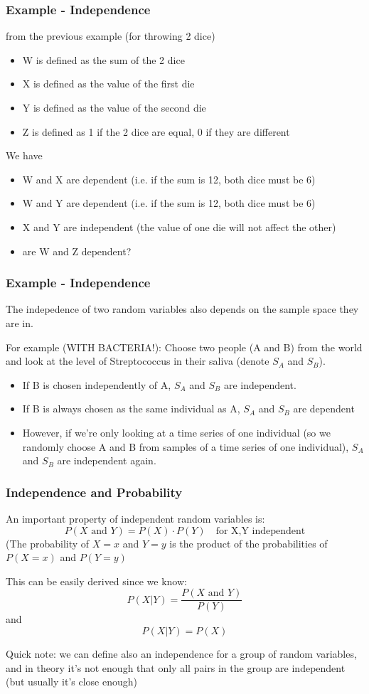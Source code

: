 \documentclass{beamer}
\begin{document}
\begin{frame}
\frametitle{Example - Independence}
from the previous example (for throwing 2 dice)
\begin{itemize}
\item W is defined as the sum of the 2 dice
\item X is defined as the value of the first die
\item Y is defined as the value of the second die
\item Z is defined as 1 if the 2 dice are equal, 0 if they are different
\end{itemize}

We have
\begin{itemize}
\item W and X are dependent (i.e. if the sum is 12, both dice must be 6)
\item W and Y are dependent (i.e. if the sum is 12, both dice must be 6)
\item X and Y are independent (the value of one die will not affect the other)
\item are W and Z dependent?
\end{itemize}

\end{frame}
\begin{frame}
\frametitle{Example - Independence}
The indepedence of two random variables also depends on the sample space they are in.

For example (WITH BACTERIA!):
Choose two people (A and B) from the world and look at the level of Streptococcus in their saliva (denote $S_A$ and $S_B$).
\begin{itemize}
\item If B is chosen independently of A, $S_A$ and $S_B$ are independent.
\item If B is always chosen as the same individual as A, $S_A$ and $S_B$ are dependent
\item However, if we're only looking at a time series of one individual (so we randomly choose A and B from samples of a time series of one individual), $S_A$ and $S_B$ are independent again.
\end{itemize}
\end{frame}

\begin{frame}
\frametitle{Independence and Probability}
An important property of independent random variables is:
$$ P(X \text{ and } Y) = P(X) \cdot P(Y) \quad \text{for X,Y independent}$$
(The probability of $X=x$ and $Y=y$ is the product of the probabilities of $P(X=x)$ and $P(Y=y)$

This can be easily derived since we know:
$$ P(X|Y)=\frac{P(X \text{ and } Y)}{P(Y)}$$ and $$P(X|Y)=P(X)$$

Quick note: we can define also an independence for a group of random variables, and in theory it's not enough that only all pairs in the group are independent (but usually it's close enough)
\end{frame}
\end{document}
